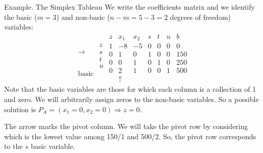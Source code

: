 \documentclass[c]{beamer}
\begin{document}
\begin{frame}{Example. The Simplex Tableau}
  We write the coefficients matrix and we identify the basic ($m=3$) and non-basic ($n-m=5-3=2$ degrees of freedom) variables:
  \begin{equation}
\begin{array}{cc}
&\\
&z \\
\rightarrow &s \\
&t \\
&u\\
\mathrm{basic}
\end{array}
%
\begin{array}{c|ccccc|c}
  z & x_1 & x_2 & s & t & u & b \\ \hline
  1 & -8 & -5 & 0 & 0 & 0 & 0 \\ \hline
  0 & 1 & 0 & 1 & 0 & 0 & 150  \\
  0 & 0 & 1 & 0 & 1 & 0 & 250 \\
  0 & 2 & 1 & 0 & 0 & 1 & 500 \\
    & \uparrow & & & & &
\end{array}
\end{equation}
  Note that the basic variables are those for which each column is a collection of 1 and zero. We will arbitrarily assign zeros to the non-basic variables.
So a possible solution is $\boxed{P_A=(x_1=0, x_2=0)\Rightarrow z=0}$.

  The arrow marks the pivot column. We will take the pivot row by considering which is the lowest value among 150/1 and 500/2. So, the pivot row corresponds to the $s$ basic variable.
\end{frame}

\end{document}
